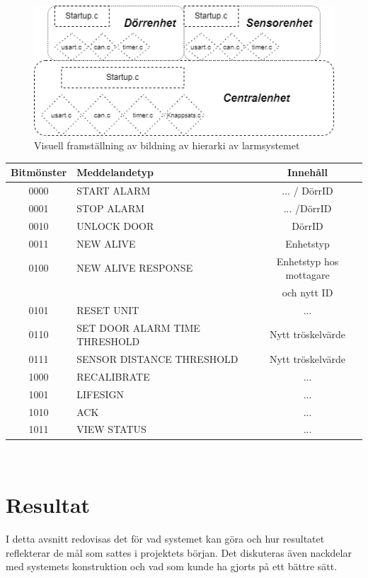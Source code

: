 \documentclass{article}
\begin{document}
\begin{figure}[h]
    \centering
    \includegraphics[scale=0.5]{Projektrapport/hierarki.png}
    \caption {Visuell framställning av bildning av hierarki av larmsystemet}
    \label{fig:drawing}
\end{figure}


\begin{tabular}{|c|l|c|}
    \hline
    Bitmönster & Meddelandetyp & Innehåll \\
    \hline
    0000 & START ALARM & ... / DörrID \\
    0001 & STOP ALARM & ... /DörrID \\
    0010 & UNLOCK DOOR & DörrID \\
    0011 & NEW ALIVE & Enhetstyp \\
    0100 & NEW ALIVE RESPONSE & Enhetstyp hos mottagare \\ 
    &&och nytt ID \\
    0101 & RESET UNIT & ... \\
    0110 & SET DOOR ALARM TIME THRESHOLD & Nytt tröskelvärde \\
    0111 & SENSOR DISTANCE THRESHOLD & Nytt tröskelvärde \\
    1000 & RECALIBRATE & ... \\
    1001 & LIFESIGN & ... \\
    1010 & ACK & ... \\
    1011 & VIEW STATUS & ... \\
    \hline
\end{tabular}
\\
\begin{center}
\caption{Figur 5: Bitmönster för de olika meddelandetyper som används för CAN-kommunikation. Meddelandetyper med lägre nummer har högre prioritet. "..."\ betyder att innehållet är tomt.}
\end{center}


\section{Resultat}
I detta avsnitt redovisas det för vad systemet kan göra och hur resultatet reflekterar de mål som sattes i projektets början. Det diskuteras även nackdelar med systemets konstruktion och vad som kunde ha gjorts på ett bättre sätt.
\end{document}
